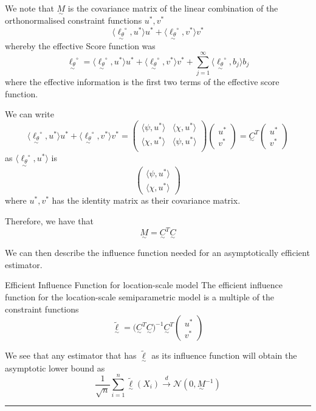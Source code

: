 \documentclass[twoside]{article}
\newenvironment{proof}{{\bf Proof:}}{\hfill\rule{2mm}{2mm}}
\newcommand{\utilde}{\underset{\sim}}
\begin{document}
We note that $\utilde{M}$ is the covariance matrix of the linear combination of the orthonormalised constraint functions $u^*, v^*$ 
$$
\langle \utilde{\ell_{\theta}}^{\circ}, u^* \rangle u^* + \langle \utilde{\ell_{\theta}}^{\circ}, v^* \rangle v^*
$$
whereby the effective Score function was 
$$
\utilde{\ell_{\theta}}^{\circ} = \langle \utilde{\ell_{\theta}}^{\circ}, u^* \rangle u^* + \langle \utilde{\ell_{\theta}}^{\circ}, v^* \rangle v^* + \sum_{j=1}^{\infty}\langle \utilde{\ell_{\theta}}^{\circ}, b_j \rangle b_j
$$
where the effective information is the first two terms of the effective score function.

We can write 
$$
\langle \utilde{\ell_{\theta}}^{\circ}, u^* \rangle u^* + \langle \utilde{\ell_{\theta}}^{\circ}, v^* \rangle v^* = 
\begin{pmatrix}
\langle \psi, u^* \rangle & \langle \chi, u^* \rangle \\
\langle \chi, u^* \rangle & \langle \psi, u^* \rangle \\
\end{pmatrix}
\begin{pmatrix}
u^*\\
v^*
\end{pmatrix}
 = \utilde{C}^T \begin{pmatrix}
u^*\\
v^*
\end{pmatrix}
$$
as $\langle \utilde{\ell_{\theta}}^{\circ}, u^* \rangle$ is 
$$
\begin{pmatrix}
\langle \psi, u^* \rangle \\ \langle \chi, u^* \rangle 
\end{pmatrix}
$$
where $u^*, v^*$ has the identity matrix as their covariance matrix.

Therefore, we have that 
$$
\utilde{M} = \utilde{C}^T \utilde{C}
$$

We can then describe the influence function needed for an asymptotically efficient estimator.

\begin{proposition_exam}{Efficient Influence Function for location-scale model}{} The efficient influence function for the location-scale semiparametric model is a multiple of the constraint functions
$$
\utilde{\tilde{\ell}} = \big(\utilde{C}^T \utilde{C} \big)^{-1}\utilde{C}^T\begin{pmatrix}
u^*\\ v^*
\end{pmatrix}
$$
\end{proposition_exam}
\begin{proof}
We see that any estimator that has $\utilde{\tilde{\ell}}$ as its influence function will obtain the asymptotic lower bound as 
$$
\frac{1}{\sqrt{n}}\sum_{i=1}^{n}\utilde{\tilde{\ell}}(X_i) \xrightarrow{d} \mathcal{N}(0, \utilde{M}^{-1})
$$
\end{proof}
\end{document}
